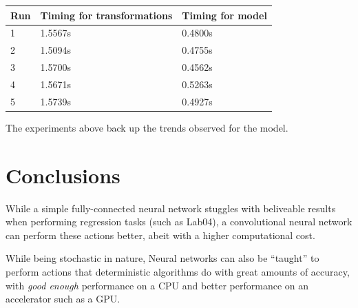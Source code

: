\documentclass[conference]{IEEEtran}
\begin{document}
\begin{center}
    \begin{tabular}{|l|l|l|}
        \hline
        Run & Timing for transformations & Timing for model \\ \hline
        1 & 1.5567s & 0.4800s \\ \hline
        2 & 1.5094s & 0.4755s \\ \hline
        3 & 1.5700s & 0.4562s \\ \hline
        4 & 1.5671s & 0.5263s \\ \hline
        5 & 1.5739s & 0.4927s \\ \hline
    \end{tabular}
\end{center}

The experiments above back up the trends observed for the model.

\section{Conclusions}
While a simple fully-connected neural network stuggles with beliveable results when performing regression tasks (such as Lab04),
a convolutional neural network can perform these actions better, abeit with a higher computational cost.

While being stochastic in nature, Neural networks can also be ``taught'' to perform actions that deterministic algorithms
do with great amounts of accuracy, with \textit{good enough} performance on a CPU and better performance on an accelerator
such as a GPU.
\end{document}
